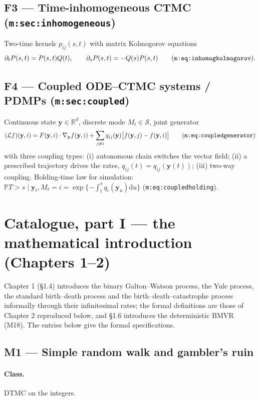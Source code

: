 \documentclass[11pt,a4paper]{article}
\newcommand{\PR}{\mathbb{P}}
\newcommand{\dd}{\mathrm{d}}
\begin{document}
\subsection*{F3 --- Time-inhomogeneous CTMC (\texttt{m:sec:inhomogeneous})}
Two-time kernels $p_{ij}(s,t)$ with matrix Kolmogorov equations
\[
\partial_t P(s,t)=P(s,t)Q(t),\qquad \partial_s P(s,t)=-Q(s)P(s,t)
\qquad\text{(\texttt{m:eq:inhomogkolmogorov})}.
\]

\subsection*{F4 --- Coupled ODE--CTMC systems / PDMPs (\texttt{m:sec:coupled})}
Continuous state $\mathbf y\in\mathbb R^d$, discrete mode $M_t\in\mathcal S$,
joint generator
\[
(\mathcal Lf)(\mathbf y,i)
=F(\mathbf y,i)\cdot\nabla_{\mathbf y}f(\mathbf y,i)
+\sum_{j\ne i}q_{ij}(\mathbf y)\bigl[f(\mathbf y,j)-f(\mathbf y,i)\bigr]
\qquad\text{(\texttt{m:eq:coupledgenerator})}
\]
with three coupling types: (i) autonomous chain switches the vector field;
(ii) a prescribed trajectory drives the rates,
$q_{ij}(t)=q_{ij}(\mathbf y(t))$; (iii) two-way coupling. Holding-time law
for simulation: $\PR{T>s\mid\mathbf y_t,M_t=i}
=\exp\{-\int_t^s q_i(\mathbf y_u)\dd u\}$ (\texttt{m:eq:coupledholding}).

\section{Catalogue, part I --- the mathematical introduction (Chapters 1--2)}

Chapter 1 (\S1.4) introduces the binary Galton--Watson process, the Yule
process, the standard birth--death process and the birth--death--catastrophe
process informally through their infinitesimal rates; the formal definitions
are those of Chapter 2 reproduced below, and \S1.6 introduces the
deterministic BMVR (M18). The entries below give the formal specifications.

\subsection{M1 --- Simple random walk and gambler's ruin}
\label{sec:M1}

\paragraph{Class.} DTMC on the integers.
\end{document}
